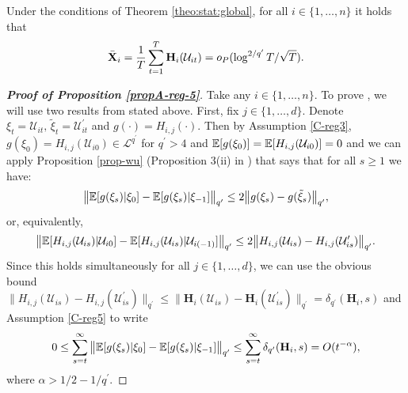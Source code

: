 \documentclass[a4paper,12pt]{article}
\makeatletter
\renewcommand{\eqref}[1]{\tagform@{\ref{#1}}}
\makeatother
\begin{document}
\begin{propA}\label{propA-reg-5}
Under the conditions of Theorem \ref{theo:stat:global}, for all $i \in \{1, \ldots, n\}$ it holds that
{\color{black}\begin{align}\label{eqA:regs}
\bar{\mathbf{X}}_i = \frac{1}{T}\sum_{t=1}^T \mathbf{H}_i (\mathcal{U}_{it}) = o_P(\log^{2/{q^\prime}}{T}/\sqrt{T}).
\end{align}}\end{propA}
\begin{proof}[\textnormal{\textbf{Proof of Proposition \ref{propA-reg-5}}}] 

Take any $i \in \{1, \ldots, n\}$. To prove \eqref{eqA:regs}, we will use two results from \cite*{Wu2007} stated above. First, fix $j \in \{1, \ldots, d\}$. Denote $\xi_t = \mathcal{U}_{it},\, \tilde{\xi}_t = \mathcal{U}^\prime_{it}$ and $g(\cdot) = H_{i,j}(\cdot)$. Then by Assumption \ref{C-reg3}, $g(\xi_0) = H_{i, j}(\mathcal{U}_{i0}) \in \mathcal{L}^{q^\prime}$ for $q^\prime > 4$ and $\mathbb{E}[g(\xi_0)] = \mathbb{E}[H_{i, j}(\mathcal{U}_{i0})] = 0$ and we can apply Proposition \ref{prop-wu} (Proposition 3(ii) in \linebreak \cite{Wu2007}) that says that for all $s \geq 1$ we have:
\begin{align*}
\big\lVert \mathbb{E} [g(\xi_s)| \xi_0] - \mathbb{E} [g(\xi_s)| \xi_{-1}]\big\rVert_{q^\prime} \leq 2 \big\lVert g(\xi_s) - g(\tilde{\xi}_s)\big\rVert_{q^\prime},
\end{align*}
or, equivalently,
\begin{align*}
\big\lVert \mathbb{E} [H_{i, j}(\mathcal{U}_{is})| \mathcal{U}_{i0}] - \mathbb{E} [H_{i, j}(\mathcal{U}_{is})| \mathcal{U}_{i(-1)}]\big\rVert_{q^\prime} \leq 2 \big\lVert H_{i, j}(\mathcal{U}_{is}) - H_{i, j}(\mathcal{U}_{is}^\prime)\big\rVert_{q^\prime}.
\end{align*}
Since this holds simultaneously for all $j \in \{1, \ldots, d\}$, we can use the obvious bound $\big\lVert H_{i, j}(\mathcal{U}_{is}) - H_{i, j}(\mathcal{U}_{is}^\prime)\big\rVert_{q^\prime} \leq \big\lVert \mathbf{H}_{i}(\mathcal{U}_{is}) - \mathbf{H}_{i}(\mathcal{U}_{is}^\prime)\big\rVert_{q^\prime} = \delta_{q^\prime}(\mathbf{H}_i, s)$ and Assumption \ref{C-reg5} to write 
\begin{align*}
0 \leq \sum_{s = t}^\infty\big\lVert \mathbb{E} [g(\xi_s)| \xi_0] - \mathbb{E} [g(\xi_s)| \xi_{-1}]\big\rVert_{q^\prime} \leq \sum_{s = t}^\infty \delta_{q^\prime}(\mathbf{H}_i, s) =O(t^{-\alpha}),
\end{align*}
where $\alpha > 1/2 - 1/{q^\prime}$.


\end{proof}
\end{document}
